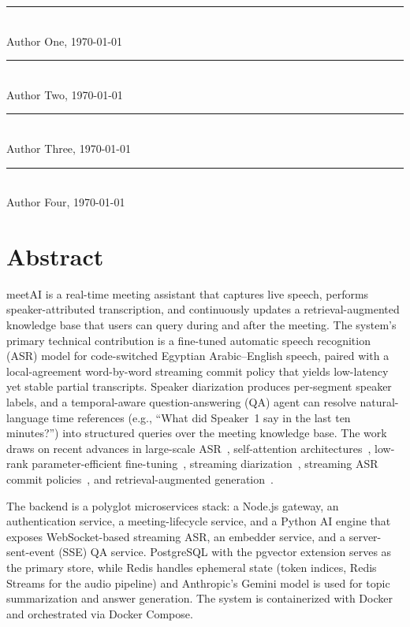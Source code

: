 \documentclass[12pt,a4paper,oneside]{book}
\theoremstyle{plain}
\theoremstyle{definition}
\theoremstyle{remark}
\newcommand{\meetai}{meetAI}
\begin{document}
\vspace{2cm}
\noindent\rule{6cm}{0.4pt}\\
Author One, \today

\noindent\rule{6cm}{0.4pt}\\
Author Two, \today

\noindent\rule{6cm}{0.4pt}\\
Author Three, \today

\noindent\rule{6cm}{0.4pt}\\
Author Four, \today

\chapter*{Abstract}

\meetai{} is a real-time meeting assistant that captures live speech, performs
speaker-attributed transcription, and continuously updates a retrieval-augmented
knowledge base that users can query during and after the meeting. The system's
primary technical contribution is a fine-tuned automatic speech recognition
(ASR) model for code-switched Egyptian Arabic--English speech, paired with a
local-agreement word-by-word streaming commit policy that yields low-latency
yet stable partial transcripts. Speaker diarization produces per-segment
speaker labels, and a temporal-aware question-answering (QA) agent can resolve
natural-language time references (e.g., ``What did Speaker~1 say in the last
ten minutes?'') into structured queries over the meeting knowledge base. The
work draws on recent advances in large-scale ASR~\citep{radford2023whisper},
self-attention architectures~\citep{vaswani2017attention}, low-rank
parameter-efficient fine-tuning~\citep{hu2021lora}, streaming
diarization~\citep{guo2024sortformer}, streaming ASR commit
policies~\citep{liu2020streaming}, and retrieval-augmented
generation~\citep{lewis2020rag, johnson2019faiss}.

The backend is a polyglot microservices stack: a Node.js gateway, an
authentication service, a meeting-lifecycle service, and a Python AI engine
that exposes WebSocket-based streaming ASR, an embedder service, and a
server-sent-event (SSE) QA service. PostgreSQL with the pgvector extension
serves as the primary store, while Redis handles ephemeral state (token
indices, Redis Streams for the audio pipeline) and Anthropic's Gemini model
is used for topic summarization and answer generation. The system is
containerized with Docker and orchestrated via Docker Compose.
\end{document}
